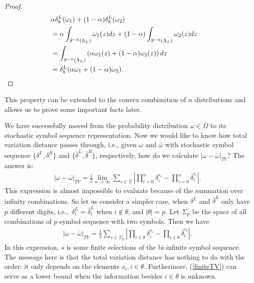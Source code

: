\begin{proof}
  \begin{align}
    \lefteqn{\alpha \delta^L_k(\omega_1) + (1-\alpha) \delta^L_k(\omega_2) } \nonumber\\
                    &=   \alpha \int_{S^{-k}(\Lambda_L)} \omega_1(z)dz+
                          (1-\alpha) \int_{S^{-k}(\Lambda_L)} \omega_2(z)dz \nonumber \\
                    &=   \int_{S^{-k}(\Lambda_L)}\left( \alpha \omega_1(z) +(1-\alpha) \omega_2(z) \right) dz \nonumber \\
                    &=   \delta^L_k( \alpha \omega_1 +(1-\alpha) \omega_2).
  \end{align}
\end{proof}
 This property can be extended to the convex combination of $n$ distributions and allows us to prove some important facts later.


We have successfully moved from the probability distribution $\omega \in \bar{\Omega}$ to its
stochastic symbol sequence representation. Now we would like to know how total variation distance
passes through, i.e., given $\omega$ and $\bar{\omega}$ with stochastic symbol sequence
$\{\delta^L, \delta^R\}$ and $\{\bar{\delta}^L,\bar{\delta}^R \}$, respectively, how do we calculate
$|\omega-\bar{\omega}|_{TV}$? The answer is:
 \begin{eqnarray}
 \label{infiniteTV}
|\omega-\bar{\omega}|_{TV} = \frac{1}{2} \lim_{n \to \infty}  \sum_{s\in\Sigma} \left| \prod_{i=0}^n\delta_i^{s_i}-\prod_{i=0}^n\bar{\delta}_i^{s_i}  \right|.
 \end{eqnarray}
This expression is almost impossible to evaluate because of the summation over infinity combinations. So let us consider a simpler case, when $\delta^L$ and $\bar{\delta}^L$ only have $p$ different digits, i.e.,\ $\delta_i^L = \bar{\delta}_i^L$ when $i\notin \theta$, and $|\theta| = p$. Let $\Sigma_p$ be the space of all combinations of $p$ symbol sequence with two symbols. Then we have
 \begin{eqnarray}
  \label{finiteTV}
|\omega-\bar{\omega}|_{TV} = \frac{1}{2} \sum_{s\in\Sigma_p}  \left| \prod_{i\in \theta}\delta_i^{s_i}-\prod_{i\in\theta}\bar{\delta}_i^{s_i}  \right|.
 \end{eqnarray}
In this expression, $s$ is some finite selections of the bi-infinite symbol sequence. The message here is that the total variation distance has nothing to do with the order: it only depends on the elements $s_i, i\in\theta$. Furthermore, (\ref{finiteTV})  can serve as a lower bound when the information besides $i\in \theta$ is unknown.







